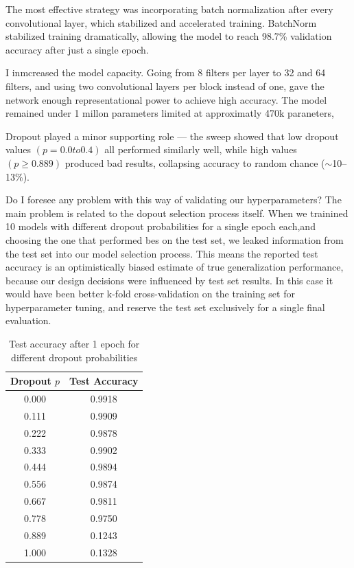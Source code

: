 \begin{subsolution}
The most effective strategy was incorporating batch normalization 
after every convolutional layer, which stabilized and accelerated training.
BatchNorm stabilized training dramatically, allowing the model to reach 
98.7\% validation accuracy after just a single epoch.

I inmcreased the model capacity. Going from 8 filters per layer to 32 and 64
filters, and using two convolutional layers per block instead of one,
gave the network enough representational power to achieve high accuracy.
The model remained under 1 millon parameters limited at approximatly 470k paraneters, 

Dropout played a minor supporting role — the sweep showed
that low dropout values $(p = 0.0 to 0.4)$ all performed 
similarly well, while high values $(p \geq 0.889)$ produced bad results,
collapsing accuracy to random chance ($\sim$10--13\%).

Do I foresee any problem with this way of validating our hyperparameters? 
The main problem is related to the dopout selection process itself. When we trainined 
10 models with different dropout probabilities for a single epoch each,and
choosing the one that performed bes on the test set, we leaked
information from the test set into our model selection process.
This means the reported test accuracy is an optimistically biased 
estimate of true generalization performance, because our design 
decisions were influenced by test set results. In this case it would have been better
k-fold cross-validation on the training set for hyperparameter 
tuning, and reserve the test set exclusively for a single final evaluation. 



\end{subsolution}

\begin{table}[h!]
\centering
\caption{Test accuracy after 1 epoch for different dropout probabilities}
\begin{tabular}{c c}
\hline
Dropout $p$ & Test Accuracy \\
\hline
0.000 & 0.9918 \\
0.111 & 0.9909 \\
0.222 & 0.9878 \\
0.333 & 0.9902 \\
0.444 & 0.9894 \\
0.556 & 0.9874 \\
0.667 & 0.9811 \\
0.778 & 0.9750 \\
0.889 & 0.1243 \\
1.000 & 0.1328 \\
\hline
\end{tabular}
\label{tab:dropout_sweep}
\end{table}


